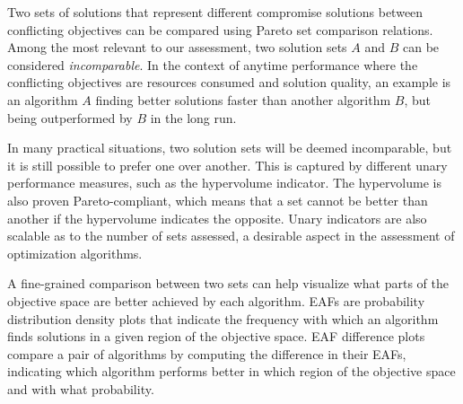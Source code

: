 \begin{description}[style=unboxed, leftmargin=0px]
\item[Set comparison relations.] Two sets of solutions that represent different compromise solutions between conflicting objectives can be compared using Pareto set comparison relations. Among the most relevant to our assessment, two solution sets $A$ and $B$ can be considered \textit{incomparable}.
In the context of anytime performance where the conflicting objectives are resources consumed and solution quality, an example is an algorithm $A$ finding better solutions faster than another algorithm $B$, but being outperformed by $B$ in the long run. 
\item [Unary performance measures~\cite{ZitThiLauFon2003:tec}.] In many practical situations, two solution sets will be deemed incomparable, but it is still possible to prefer one over another. This is captured by different unary performance measures, such as the hypervolume indicator. The hypervolume is also proven Pareto-compliant, which means that a set cannot be better than another if the hypervolume indicates the opposite. Unary indicators are also scalable as to the number of sets assessed, a desirable aspect in the assessment of optimization algorithms.
\item [Empirical attainment functions~(EAFs)~\cite{LopPaqStu09emaa}.] A fine-grained comparison between two sets can help visualize what parts of the objective space are better achieved by each algorithm. EAFs are probability distribution density plots that indicate the frequency with which an algorithm finds solutions in a given region of the objective space. EAF difference plots compare a pair of algorithms by computing the difference in their EAFs, indicating which algorithm performs better in which region of the objective space and with what probability. 
\end{description}


